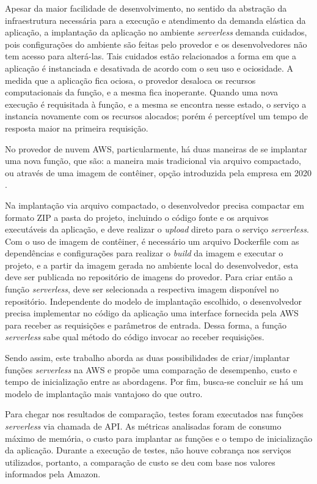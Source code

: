 \documentclass[conference]{IEEEtran}
\begin{document}
Apesar da maior facilidade de desenvolvimento, no sentido da abstração da infraestrutura necessária para a execução e atendimento da demanda elástica da aplicação, a implantação da aplicação no ambiente \textit{serverless} demanda cuidados, pois configurações do ambiente são feitas pelo provedor e os desenvolvedores não tem acesso para alterá-las. Tais cuidados estão relacionados a forma em que a aplicação é instanciada e desativada de acordo com o seu uso e ociosidade. A medida que a aplicação fica ociosa, o provedor desaloca os recursos computacionais da função, e a mesma fica inoperante. Quando uma nova execução é requisitada à função, e a mesma se encontra nesse estado, o serviço a instancia novamente com os recursos alocados; porém é perceptível um tempo de resposta maior na primeira requisição.   

No provedor de nuvem AWS, particularmente, há duas maneiras de se implantar uma nova função, que são: a maneira mais tradicional via arquivo compactado, ou através de uma imagem de contêiner, opção introduzida pela empresa em 2020 \cite{aws_2020_supports_container_image}.

Na implantação via arquivo compactado, o desenvolvedor precisa compactar em formato ZIP a pasta do projeto, incluindo o código fonte e os arquivos executáveis da aplicação, e deve realizar o \textit{upload} direto para o serviço \textit{serverless}. Com o uso de imagem de contêiner, é necessário um arquivo Dockerfile com as dependências e configurações para realizar o \textit{build} da imagem e executar o projeto, e a partir da imagem gerada no ambiente local do desenvolvedor, esta deve ser publicada no repositório de imagens do provedor. Para criar então a  função \textit{serverless}, deve ser selecionada a respectiva imagem disponível no repositório. 
Independente do modelo de implantação escolhido, o desenvolvedor precisa implementar no código da aplicação uma interface fornecida pela AWS para receber as requisições e parâmetros de entrada. Dessa forma, a função \textit{serverless} sabe qual método do código invocar ao receber requisições.

Sendo assim, este trabalho aborda as duas possibilidades de criar/implantar funções \textit{serverless} na AWS e propõe uma comparação de desempenho, custo e tempo de inicialização entre as abordagens. Por fim, busca-se concluir se há um modelo de implantação mais vantajoso do que outro.

Para chegar nos resultados de comparação, testes foram executados nas funções \textit{serverless} via chamada de API. As métricas analisadas foram de consumo máximo de memória, o custo para implantar as funções e o tempo de inicialização da aplicação. Durante a execução de testes, não houve cobrança nos serviços utilizados, portanto, a comparação de custo se deu com base nos valores informados pela Amazon.
\end{document}
